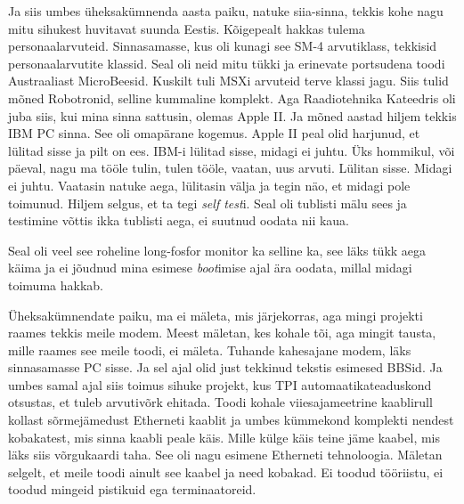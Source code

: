 Ja siis umbes üheksakümnenda aasta paiku, natuke siia-sinna, tekkis kohe nagu 
mitu sihukest huvitavat suunda Eestis. Kõigepealt hakkas tulema 
personaalarvuteid. Sinnasamasse, kus oli kunagi see SM-4 arvutiklass, tekkisid 
personaalarvutite klassid. Seal oli  neid mitu tükki ja erinevate portsudena 
toodi Austraaliast MicroBeesid. Kuskilt tuli MSXi 
arvuteid terve klassi jagu. Siis tulid mõned 
Robotronid, selline kummaline komplekt. 
Aga Raadiotehnika Kateedris oli juba siis, kui mina sinna sattusin, olemas 
Apple II. Ja mõned aastad hiljem tekkis IBM 
PC sinna. See oli omapärane kogemus. Apple II peal olid 
harjunud, et lülitad sisse ja pilt on ees. IBM-i lülitad sisse, midagi ei 
juhtu. Üks hommikul, või päeval, nagu ma tööle tulin, tulen tööle, vaatan, uus 
arvuti. Lülitan sisse. Midagi ei juhtu. Vaatasin natuke aega, lülitasin välja 
ja tegin näo, et midagi pole toimunud. Hiljem selgus, et ta tegi \emph{self 
test}i. Seal oli tublisti mälu sees ja testimine võttis ikka tublisti aega, ei 
suutnud oodata nii kaua. 


Seal oli veel see roheline long-fosfor monitor ka selline ka, see läks tükk 
aega käima ja ei jõudnud mina esimese \emph{boot}imise ajal ära oodata, millal 
midagi toimuma hakkab.

Üheksakümnendate paiku, ma ei mäleta, mis järjekorras, aga mingi projekti 
raames tekkis meile modem. Meest mäletan, kes kohale tõi, aga mingit tausta, 
mille raames see meile toodi, ei mäleta. Tuhande kahesajane modem, läks 
sinnasamasse PC sisse. Ja sel ajal olid just tekkinud tekstis esimesed BBSid. 
Ja umbes samal ajal siis toimus sihuke projekt, kus TPI 
automaatikateaduskond 
otsustas, et tuleb arvutivõrk ehitada. Toodi kohale viiesajameetrine kaablirull 
kollast sõrmejämedust Etherneti kaablit ja umbes kümmekond komplekti nendest 
kobakatest, mis sinna kaabli peale käis. Mille külge käis teine jäme kaabel, 
mis läks siis võrgukaardi taha. See oli nagu esimene Etherneti tehnoloogia. 
Mäletan selgelt, et meile toodi ainult see kaabel ja need kobakad. Ei toodud 
tööriistu, ei toodud mingeid pistikuid ega terminaatoreid.

